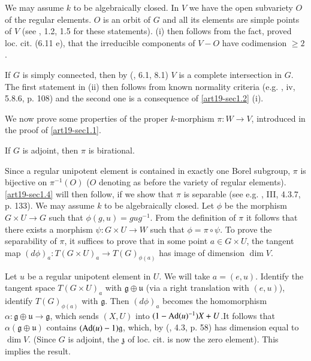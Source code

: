 We may assume $k$ to be algebraically closed. In $V$ we have the open subvariety $O$ of the regular elements. $O$ is an orbit of $G$ and all its elements are simple points of $V$ (see \cite{art19-key15}, 1.2, 1.5 for these statements). (i) then follows from the fact, proved loc. cit. (6.11 e), that the irreducible components of $V-O$ have codimension $\geq 2$.

If $G$ is simply connected, then by (\cite{art19-key15}, 6.1, 8.1) $V$ is a complete intersection in $G$. The first statement in (ii) then follows from known normality criteria (e.g. \cite{art19-key7}, iv, 5.8.6, p. 108) and the second one is a consequence of \ref{art19-sec1.2} (i).

We now prove some properties of the proper $k$-morphism $\pi:W\to V$, introduced in the proof of \ref{art19-sec1.1}.

\begin{proposition}\label{art19-prop1.4}
If $G$ is adjoint, then $\pi$ is birational.
\end{proposition}

Since a regular unipotent element is contained in exactly one Borel subgroup, $\pi$ is bijective on $\pi^{-1}(O)$ ($O$ denoting as before the variety of regular elements). \ref{art19-sec1.4} will then follow, if we show that $\pi$ is separable (see e.g. \cite{art19-key17}, III, 4.3.7, p. 133). We may assume $k$ to be algebraically closed. Let $\phi$ be the morphism $G\times U\to G$ such that $\phi(g,u)=gug^{-1}$. From the definition of $\pi$ it follows that there exists a morphism $\psi : G\times U\to W$ such that $\phi=\pi\circ\psi$. To prove the separability of $\pi$, it suffices to prove that in some point $a\in G\times U$, the tangent map $(d\phi)_{a}:T(G\times U)_{a}\to T(G)_{\phi(a)}$ has image of dimension $\dim V$.

Let $u$ be a regular unipotent element in $U$. We will take $a=(e,u)$. Identify the tangent space $T(G\times U)_{a}$ with $\mathfrak{g}\oplus \mathfrak{u}$ (via a right translation with $(e,u)$), identify $T(G)_{\phi(a)}$ with $\mathfrak{g}$. Then $(d\phi)_{a}$ becomes the homomorphism $\alpha :\mathfrak{g}\oplus \mathfrak{u}\to \mathfrak{g}$, which sends $(X,U)$ into $(1-\operatorname{\mathrm{Ad}}(u)^{-1})X+U$.\pageoriginale It follows that $\alpha(\mathfrak{g}\oplus \mathfrak{u})$ contains $(\operatorname{\mathrm{Ad}} (u)-1)\mathfrak{g}$, which, by (\cite{art19-key15}, 4.3, p. 58) has dimension equal to $\dim V$. (Since $G$ is adjoint, the $\mathfrak{z}$ of loc. cit. is now the zero element). This implies the result.

